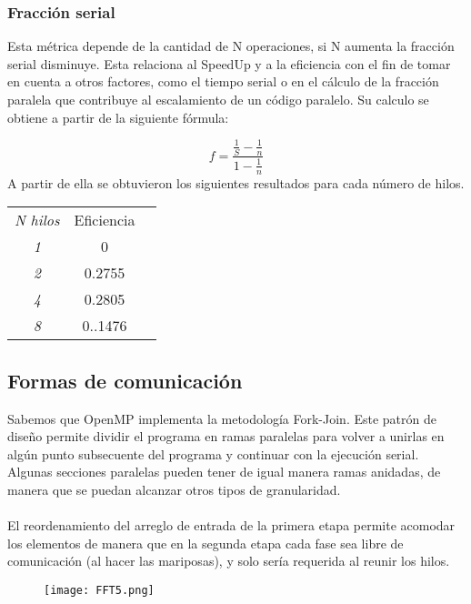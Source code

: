 \documentclass{article}
\begin{document}
\subsubsection{Fracción serial}

Esta métrica depende de la cantidad de N operaciones, si N aumenta la fracción serial disminuye. Esta relaciona al SpeedUp y a la eficiencia con el fin de tomar en cuenta a otros factores, como el tiempo serial o en el cálculo de la fracción paralela que contribuye al escalamiento de un código paralelo. Su calculo se obtiene a partir de la siguiente fórmula:

$$
f=\frac{\frac{1}{S}-\frac{1}{n}}{{1}-{\frac{1}{n}}}
$$
A partir de ella se obtuvieron los siguientes resultados para cada número de hilos.\\

\begin{center}
\begin{tabular}{ c c c }
\textit{N hilos} & Eficiencia\\
 \textit{1} & 0\\ 
 \textit{2} & 0.2755\\ 
\textit{4} & 0.2805\\
\textit{8} & 0..1476
\end{tabular}
\end{center}

\subsection{Formas de comunicación}

Sabemos que OpenMP implementa la metodología Fork-Join. Este patrón de diseño permite dividir el programa en ramas paralelas para volver a unirlas en algún punto subsecuente del programa y continuar con la ejecución serial. Algunas secciones paralelas pueden tener de igual manera ramas anidadas, de manera que se puedan alcanzar otros tipos de granularidad. \\ \\
El reordenamiento del arreglo de entrada de la primera etapa permite acomodar los elementos de manera que en la segunda etapa cada fase sea libre de comunicación (al hacer las mariposas), y solo sería requerida al reunir los hilos.\\

\begin{figure}[h]
\centering
\texttt{[image: FFT5.png]}
\end{figure}
\end{document}
